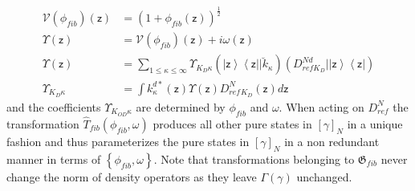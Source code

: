 \documentclass[aps,preprint]{revtex4}%
\begin{document}
\begin{align}
\mathcal{V}\left(  \phi_{fib}\right)  \left(  \mathsf{z}\right)   &  =\left(
1+\phi_{fib}\left(  \mathsf{z}\right)  \right)  ^{\frac{1}{2}}\nonumber\\
\Upsilon\left(  \mathsf{z}\right)   &  =\mathcal{V}\left(  \phi_{fib}\right)
\left(  \mathsf{z}\right)  +i\omega\left(  \mathsf{z}\right) \nonumber\\
\Upsilon\left(  \mathsf{z}\right)   &  =\sum_{1\leq\kappa\leq\infty}%
\Upsilon_{K_{D}\kappa}\left(  \left|  \mathsf{z}\right\rangle \left\langle
\mathsf{z}\right|  |\breve{k}_{\kappa}\right)  \left(  D_{refK_{D}}%
^{Nd}|\left|  \mathsf{z}\right\rangle \left\langle \mathsf{z}\right|  \right)
\nonumber\\
\Upsilon_{K_{D}\kappa}  &  =\int k_{\kappa}^{d\ast}\left(  \mathsf{z}\right)
\Upsilon\left(  \mathsf{z}\right)  D_{ref}^{N}{}_{K_{D}}\left(  \mathsf{z}%
\right)  d\mathsf{z}%
\end{align}
and the coefficients $\Upsilon_{K_{OD}\kappa}$ are determined by $\phi_{fib}$
and $\omega$. When acting on $D_{ref}^{N}$ the transformation $\hat{T}%
_{fib}\left(  \phi_{fib},\omega\right)  $ produces all other pure states in
$\left[  \gamma\right]  _{N}$ in a unique fashion and thus parameterizes the
pure states in $\left[  \gamma\right]  _{N}$ in a non redundant manner in
terms of $\left\{  \phi_{fib},\omega\right\}  $. Note that transformations
belonging to $\mathfrak{G}_{fib}$ never change the norm of density operators
as they leave $\Gamma\left(  \gamma\right)  $ unchanged.
\end{document}
